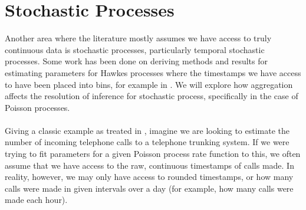 \documentclass[11pt,a4,twosided,singlespacing,titlepagenumber=on,numbers=endperiod]{scrreprt}
\numberwithin{equation}{chapter} %
\theoremstyle{remark}
\begin{document}
\section{Stochastic Processes}
Another area where the literature mostly assumes we have access to truly continuous data is stochastic processes, particularly temporal stochastic processes. Some work has been done on deriving methods and results for estimating parameters for Hawkes processes where the timestamps we have access to have been placed into bins, for example in \cite{shlomovich2020monte}. We will explore how aggregation affects the resolution of inference for stochastic process, specifically in the case of Poisson processes. \\\\
Giving a classic example as treated in \cite{erlang}, imagine we are looking to estimate the number of incoming telephone calls to a telephone trunking system. If we were trying to fit parameters for a given Poisson process rate function to this, we often assume that we have access to the raw, continuous timestamps of calls made. In reality, however, we may only have access to rounded timestamps, or how many calls were made in given intervals over a day (for example, how many calls were made each hour).
\end{document}
